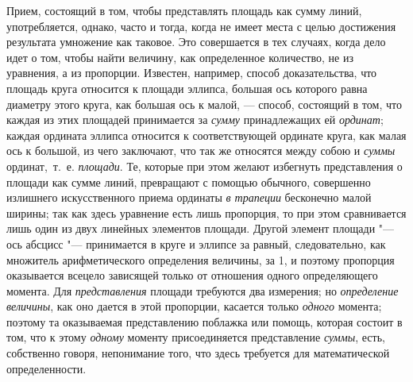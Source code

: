 Прием, состоящий в том, чтобы представлять площадь как сумму линий,
употребляется, однако, часто и тогда, когда не имеет места с целью
достижения результата умножение как таковое. Это совершается в тех случаях,
когда дело идет о том, чтобы найти величину, как определенное количество,
не из уравнения, а из пропорции. Известен, например, способ доказательства,
что площадь круга относится к площади эллипса, большая ось которого равна
диаметру этого круга, как большая ось к малой, — способ, состоящий в том,
что каждая из этих площадей принимается за {\em сумму}
принадлежащих ей {\em ординат}; каждая ордината эллипса
относится к соответствующей ординате круга, как малая ось к большой, из
чего заключают, что так же относятся между собою и
{\em суммы} ординат,~т.~е.
{\em площади}. Те, которые при этом желают избегнуть
представления о площади как сумме линий, превращают с помощью обычного,
совершенно излишнего искусственного приема ординаты
{\em в трапеции} бесконечно малой ширины; так как здесь
уравнение есть лишь пропорция, то при этом сравнивается лишь один из двух
линейных элементов площади. Другой элемент площади "--- ось абсцисс
"--- принимается в круге и эллипсе за равный, следовательно, как множитель
арифметического определения величины, за 1, и поэтому пропорция оказывается
всецело зависящей только от отношения одного определяющего момента. Для
{\em представления} площади требуются два измерения; но
{\em определение величины}, как оно дается в этой
пропорции, касается только {\em одного} момента;
поэтому та оказываемая представлению поблажка или помощь, которая состоит в
том, что к этому {\em одному} моменту присоединяется
представление {\em суммы}, есть, собственно говоря,
непонимание того, что здесь требуется для математической определенности.

